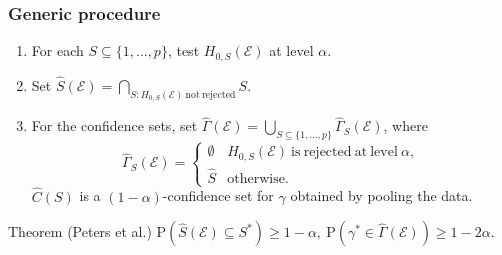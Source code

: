 \documentclass{beamer}
\begin{document}
\begin{frame}
  \frametitle{Generic procedure}
  \begin{exampleblock}{}
    \begin{enumerate}
    \item For each $S \subseteq \{1,\dotsc,p\}$, test
      $H_{0,S}(\mathcal{E})$ at level $\alpha$.
    \item Set $\hat{S}(\mathcal{E}) =
      \underset{S:H_{0,S}(\mathcal{E})\mathrm{~not~rejected}}{\bigcap}
      S$.
    \item For the confidence sets, set $\hat{\Gamma}(\mathcal{E}) =
      \underset{S \subseteq \{1,\dotsc,p\}}{\bigcup}
      \hat{\Gamma}_S(\mathcal{E})$, where
      \[
      \hat{\Gamma}_S(\mathcal{E}) =
      \begin{cases}
        \emptyset &
        H_{0,S}(\mathcal{E})\mathrm{~is~rejected~at~level~}\alpha, \\
        \hat{S} & \mathrm{otherwise}.
      \end{cases}
      \]
      $\hat{C}(S)$ is a $(1-\alpha)$-confidence set for $\gamma$ obtained by
      pooling the data.
    \end{enumerate}
  \end{exampleblock}

  \begin{block}{Theorem (Peters et al.)} \centering
    $\mathrm{P}(\hat{S}(\mathcal{E}) \subseteq S^{*}) \ge 1-\alpha,~
    \mathrm{P}(\gamma^{*} \in \hat{\Gamma}(\mathcal{E})) \ge 1 - 2\alpha$.
  \end{block}
\end{frame}
\end{document}
